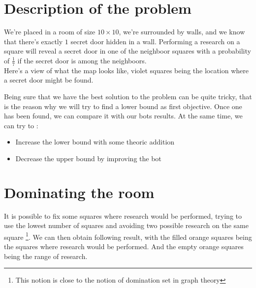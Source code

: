 \documentclass{article}
\begin{document}
\section{Description of the problem}
We're placed in a room of size $10 \times 10$, we're surrounded by walls, and
we know that there's exactly $1$ secret door hidden in a wall. Performing a
research on a square will reveal a secret door in one of the neighboor squares
with a probability of $\frac{1}{7}$ if the secret door is among the neighboors.
\\
Here's a view of what the map looks like, violet squares being the location
where a secret door might be found.


\begin{center}
\end{center}

Being sure that we have the best solution to the problem can be quite tricky,
that is the reason why we will try to find a lower bound as first objective.
Once one has been found, we can compare it with our bots results. At the same
time, we can try to :
\begin{itemize}
\item Increase the lower bound with some theoric addition
\item Decrease the upper bound by improving the bot
\end{itemize}

\section{Dominating the room}
It is possible to fix some squares where research would be performed, trying to
use the lowest number of squares and avoiding two possible research on the
same square \footnote{This notion is close to the notion of domination set in
graph theory}. We can then obtain following result, with the filled orange
squares being the squares where research would be performed. And the empty
orange squares being the range of research.
\end{document}
